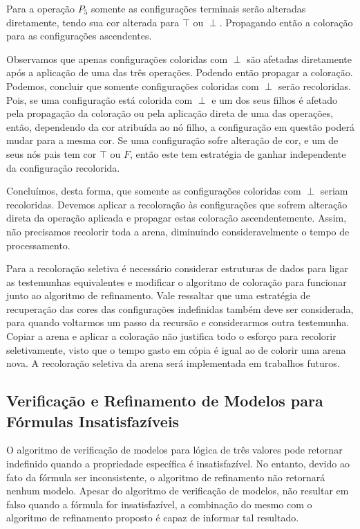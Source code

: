 \documentclass[normaltoc,capchap,capsec,times]{abnt}
\begin{document}
Para a operação $P_5$ somente as configurações terminais serão alteradas diretamente, tendo sua cor alterada para $\top$ ou $\perp$. Propagando então a coloração para as configurações ascendentes.

Observamos que apenas configurações coloridas com $\perp$ são afetadas diretamente após a aplicação de uma das três operações. Podendo então propagar a coloração. Podemos, concluir que somente configurações coloridas com $\perp$ serão recoloridas. Pois, se uma configuração está colorida com $\perp$ e um dos seus filhos é afetado pela propagação da coloração ou pela aplicação direta de uma das operações, então, dependendo da cor atribuída ao nó filho, a configuração em questão poderá mudar para a mesma cor. Se uma configuração sofre alteração de cor, e um de seus nós pais tem cor $\top$ ou $F$, então este tem estratégia de ganhar independente da configuração recolorida. 

Concluímos, desta forma, que  somente as configurações coloridas com $\perp$ seriam recoloridas. Devemos aplicar a recoloração às configurações que sofrem alteração direta da operação aplicada e propagar estas coloração ascendentemente. Assim, não precisamos recolorir toda a arena, diminuindo consideravelmente o tempo de processamento.


Para a recoloração seletiva é necessário considerar estruturas de dados para ligar as testemunhas equivalentes e modificar o algoritmo de coloração para funcionar junto ao algoritmo de refinamento. Vale ressaltar que uma estratégia de recuperação das cores das configurações indefinidas também deve ser considerada, para quando voltarmos um passo da recursão e considerarmos outra testemunha. Copiar a arena e aplicar a coloração não justifica todo o esforço para recolorir seletivamente, visto que o tempo gasto em cópia é igual ao de colorir uma arena nova. A recoloração seletiva da arena será implementada em trabalhos futuros.%


\subsection{Verificação e Refinamento de Modelos para Fórmulas Insatisfazíveis}

O algoritmo de verificação de modelos para lógica de três valores pode retornar indefinido quando a propriedade específica é insatisfazível. No entanto, devido ao fato da fórmula ser inconsistente, o algoritmo de refinamento não retornará nenhum modelo. Apesar do algoritmo de verificação de modelos, não resultar em falso quando a fórmula for insatisfazível, a combinação do mesmo com o algoritmo de refinamento proposto é capaz de informar tal resultado.
\end{document}
